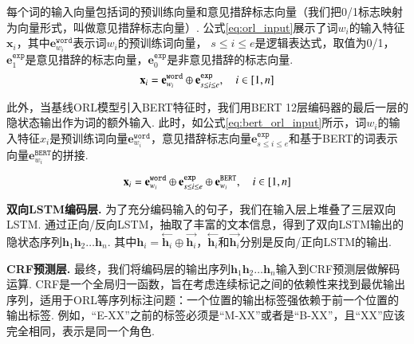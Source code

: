 每个词的输入向量包括词的预训练向量和意见措辞标志向量（我们把0/1标志映射为向量形式，叫做意见措辞标志向量）. 公式\ref{eq:orl_input}展示了词$w_i$的输入特征$\mathbf{x}_i$，其中$\mathbf{e}_{w_i}^{\texttt{word}}$表示词$w_i$的预训练词向量， $s\leq i\leq e$是逻辑表达式，取值为0/1，$\mathbf{e}_1^{\texttt{exp}}$是意见措辞的标志向量，$\mathbf{e}_0^{\texttt{exp}}$是非意见措辞的标志向量.
\begin{equation}
    \setlength{\abovedisplayskip}{9pt}
    \setlength{\belowdisplayskip}{9pt}
    \label{eq:orl_input}
    \mathbf{x}_i = \mathbf{e}_{w_i}^{\texttt{word}} \oplus \mathbf{e}_{s\leq i\leq e}^{\texttt{exp}}, \quad i \in [1,n]
\end{equation}

此外，当基线ORL模型引入BERT特征时，我们用BERT 12层编码器的最后一层的隐状态输出作为词的额外输入. 此时，如公式\ref{eq:bert_orl_input}所示，词$w_i$的输入特征$x_i$是预训练词向量$\mathbf{e}_{w_i}^{\texttt{word}}$，意见措辞标志向量$\mathbf{e}_{s\leq i\leq e}^{\texttt{exp}}$和基于BERT的词表示向量$\mathbf{e}_{w_i}^{\texttt{BERT}}$的拼接.

\begin{equation}
    \setlength{\abovedisplayskip}{9pt}
    \setlength{\belowdisplayskip}{9pt}
    \label{eq:bert_orl_input}
    \mathbf{x}_i = \mathbf{e}_{w_i}^{\texttt{word}} \oplus \mathbf{e}_{s\leq i\leq e}^{\texttt{exp}} \oplus \mathbf{e}_{w_i}^{\texttt{BERT}}, \quad i \in [1,n]
\end{equation}

\textbf{双向LSTM编码层.  } 为了充分编码输入的句子，我们在输入层上堆叠了三层双向LSTM.
通过正向/反向LSTM，抽取了丰富的文本信息，得到了双向LSTM输出的隐状态序列$\mathbf{h}_1 \mathbf{h}_2\dots \mathbf{h}_n$. 其中$\mathbf{h}_i=\stackrel{\leftarrow}{\mathbf{h}_i} \oplus \stackrel{\rightarrow}{\mathbf{h}_i}$，$\stackrel{\leftarrow}{\mathbf{h}_i}$和$\stackrel{\rightarrow}{\mathbf{h}_i}$分别是反向/正向LSTM的输出.

\textbf{CRF预测层.  }
最终，我们将编码层的输出序列$\mathbf{h}_1 \mathbf{h}_2\dots \mathbf{h}_n$输入到CRF预测层做解码运算. CRF是一个全局归一函数，旨在考虑连续标记之间的依赖性来找到最优输出序列，适用于ORL等序列标注问题：一个位置的输出标签强依赖于前一个位置的输出标签. 例如，“E-XX”之前的标签必须是“M-XX”或者是“B-XX”，且“XX”应该完全相同，表示是同一个角色.


